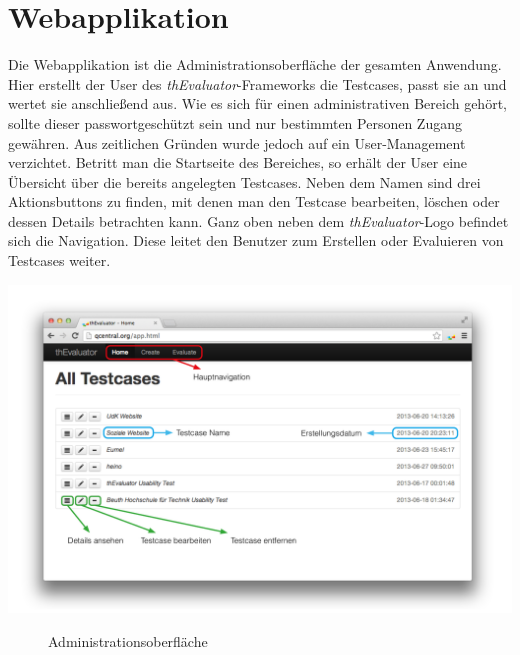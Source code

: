 %
%
%
%

\section{Webapplikation}

Die Webapplikation ist die Administrationsoberfläche der gesamten Anwendung. Hier erstellt der User des \textit{thEvaluator}-Frameworks die Testcases, passt sie an und wertet sie anschließend aus. Wie es sich für einen administrativen Bereich gehört, sollte dieser passwortgeschützt sein und nur bestimmten Personen Zugang gewähren. Aus zeitlichen Gründen wurde jedoch auf ein User-Management verzichtet. Betritt man die Startseite des Bereiches, so erhält der User eine Übersicht über die bereits angelegten Testcases. Neben dem Namen sind drei Aktionsbuttons zu finden, mit denen man den Testcase bearbeiten, löschen oder dessen Details betrachten kann. Ganz oben neben dem \textit{thEvaluator}-Logo befindet sich die Navigation. Diese leitet den Benutzer zum Erstellen oder Evaluieren von Testcases weiter.

\begin{center}
\includegraphics[scale=0.40]{./images/webappscreen}
\end{center}
\begin{figure}[htb]
   \centering
   \caption{Administrationsoberfläche}
    \label{webappview}
\end{figure}

